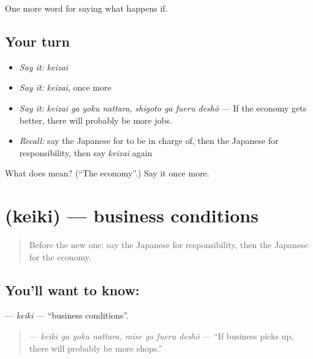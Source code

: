 \begin{grammarlens}[title={What you've built}]
One more word for saying what happens if.
\end{grammarlens}

\subsection*{Your turn}
\begin{itemize}
\raggedright
  \item \emph{Say it:} \emph{keizai}
  \item \emph{Say it:} \emph{keizai}, once more
  \item \emph{Say it:} \emph{keizai ga yoku nattara, shigoto ga fueru deshō} — If the economy gets better, there will probably be more jobs.
  \item \emph{Recall:} say the Japanese for to be in charge of, then the Japanese for responsibility, then say \emph{keizai} again
\end{itemize}

\begin{tcolorbox}[breakable,colback=teal!4,colframe=teal!35!black,title={Before you move on}]
What does  mean? (\textquotedblleft{}The economy\textquotedblright{}.) Say it once more.
\end{tcolorbox}
\section[\texorpdfstring{\ja{けいき} (keiki)}{けいき (keiki)}]{ (keiki) — business conditions}

\label{lesson:JA-C365-keiki}



\begin{quote}
Before the new one: say the Japanese for responsibility, then the Japanese for the economy.
\end{quote}

\subsection*{You'll want to know: }
\textbf{} — \emph{keiki} — \textquotedblleft{}business conditions\textquotedblright{}.

\begin{quote}
\textbf{   } — \emph{keiki ga yoku nattara, mise ga fueru deshō} — \textquotedblleft{}If business picks up, there will probably be more shops.\textquotedblright{}
\end{quote}


